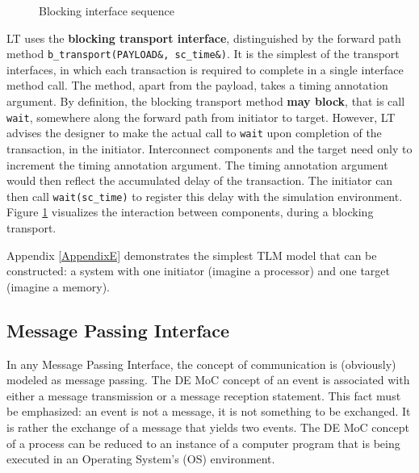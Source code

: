 \documentclass[11pt]{article}
\begin{document}
\begin{figure}[htpb]
\begin{center}
\end{center}
\caption{Blocking interface sequence} 
\label{fig:sequence}
\end{figure}

LT uses the \textbf{blocking transport interface}, distinguished by the forward path method \texttt{b\_transport(PAYLOAD&, sc\_time&)}.
It is the simplest of the transport interfaces, in which each transaction is required to complete in a single interface method call.
The method, apart from the payload, takes a timing annotation argument.
By definition, the blocking transport method \textbf{may block}, that is call \texttt{wait}, somewhere along the forward path from initiator to target.
However, LT advises the designer to make the actual call to \texttt{wait} upon completion of the transaction, in the initiator.
Interconnect components and the target need only to increment the timing annotation argument.
The timing annotation argument would then reflect the accumulated delay of the transaction.
The initiator can then call \texttt{wait(sc\_time)} to register this delay with the simulation environment.
Figure \ref{fig:sequence} visualizes the interaction between components, during a blocking transport.

Appendix \ref{AppendixE} demonstrates the simplest TLM model that can be constructed: a system with one initiator (imagine a processor) and one target (imagine a memory).
\clearpage

\subsection{Message Passing Interface}
\label{sec:org703ae9b}
In any Message Passing Interface, the concept of communication is (obviously) modeled as message passing.
The DE MoC concept of an event is associated with either a message transmission or a message reception statement.
This fact must be emphasized: an event is not a message, it is not something to be exchanged.
It is rather the exchange of a message that yields two events.
The DE MoC concept of a process can be reduced to an instance of a computer program that is being executed \cite{Tanenbaum1998} in an Operating System's (OS) environment.
\end{document}
